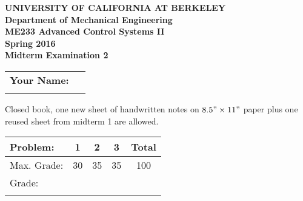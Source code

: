 \documentclass[letterpaper,12pt]{article}
\begin{document}
\begin{center}
    {\bf UNIVERSITY OF CALIFORNIA AT BERKELEY}\\
    {\bf Department of Mechanical Engineering}\\
    {\bf ME233  Advanced Control Systems II\\
    Spring 2016} \\ \vspace{2ex}
    {\Large \bf{ Midterm Examination 2 }}
\end{center}

\begin{tabular}{|l l|}
    \hline
    {\bf Your Name:} & \hspace{4in}$\:$\\
    $\:$ & $\:$\\
    \hline
\end{tabular}

$\:$\\

\noindent
Closed book, one new sheet of handwritten notes on $8.5" \times 11"$ paper
plus one reused sheet from midterm 1 are allowed. \\

\begin{tabular}{|l | c | c | c| c |  }
    \hline
    Problem: & 1 & 2 & 3   &Total \\ \hline
    Max. Grade: & 30 & 35 & 35 & 100 \\ \hline
    Grade: & \hspace{.5in} &\hspace{.5in} &\hspace{.5in}  &\hspace{.5in}  \\
    & & & & \\
    \hline
\end{tabular}



\newpage $\,$ \newpage

\newpage $\,$ \newpage

\newpage $\,$ \newpage
\newpage $\,$ \newpage
\end{document}
